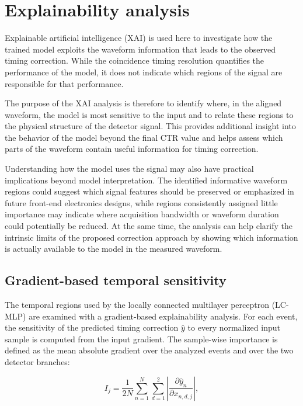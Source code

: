 \section{Explainability analysis}

Explainable artificial intelligence (XAI) is used here to investigate how the trained model exploits the waveform information that leads to the observed 
timing correction. While the coincidence timing resolution quantifies the performance of the model, it does not indicate which regions of the signal are 
responsible for that performance.

The purpose of the XAI analysis is therefore to identify where, in the aligned waveform, the model is most sensitive to the input and to relate these 
regions to the physical structure of the detector signal. This provides additional insight into the behavior of the model beyond the final CTR value 
and helps assess which parts of the waveform contain useful information for timing correction.

Understanding how the model uses the signal may also have practical implications beyond model interpretation. 
The identified informative waveform regions could suggest which signal features should be preserved or emphasized in future front-end electronics 
designs, while regions consistently assigned little importance may indicate where acquisition bandwidth or waveform duration could potentially be 
reduced. At the same time, the analysis can help clarify the intrinsic limits of the proposed correction approach by showing which information is 
actually available to the model in the measured waveform.

\subsection{Gradient-based temporal sensitivity}

The temporal regions used by the locally connected multilayer perceptron (LC-MLP) are examined with a gradient-based explainability analysis. For each event, the sensitivity of the predicted timing correction \(\widehat{y}\) to every normalized input sample is computed from the input gradient. The sample-wise importance is defined as the mean absolute gradient over the analyzed events and over the two detector branches:

\begin{equation}
    I_j
    =
    \frac{1}{2N}
    \sum_{n=1}^{N}
    \sum_{d=1}^{2}
    \left|
        \frac{\partial \widehat{y}_n}
             {\partial x_{n,d,j}}
    \right|,
\end{equation}


